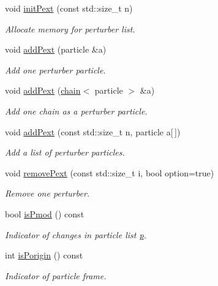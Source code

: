 \begin{DoxyCompactItemize}
void \hyperlink{classARC_1_1chain_a8e31c6a438a72d322889d0ca82fa6bf8}{init\+Pext} (const std\+::size\+\_\+t n)
\begin{DoxyCompactList}\small\item\em Allocate memory for perturber list. \end{DoxyCompactList}\item 
void \hyperlink{classARC_1_1chain_a029906394e7b73881c0980c00bf978f7}{add\+Pext} (particle \&a)
\begin{DoxyCompactList}\small\item\em Add one perturber particle. \end{DoxyCompactList}\item 
void \hyperlink{classARC_1_1chain_a5ab3934ce4a203cd57bfabcc3caf54b3}{add\+Pext} (\hyperlink{classARC_1_1chain}{chain}$<$ particle $>$ \&a)
\begin{DoxyCompactList}\small\item\em Add one chain as a perturber particle. \end{DoxyCompactList}\item 
void \hyperlink{classARC_1_1chain_a71c8d6ac1e58694b8207aabc7266110f}{add\+Pext} (const std\+::size\+\_\+t n, particle a\mbox{[}$\,$\mbox{]})
\begin{DoxyCompactList}\small\item\em Add a list of perturber particles. \end{DoxyCompactList}\item 
void \hyperlink{classARC_1_1chain_ae7d38ba85ba25ec0d7f6e4463a46afba}{remove\+Pext} (const std\+::size\+\_\+t i, bool option=true)
\begin{DoxyCompactList}\small\item\em Remove one perturber. \end{DoxyCompactList}\item 
bool \hyperlink{classARC_1_1chain_a9ed7067050141069bc98dccf8f7ab9d0}{is\+Pmod} () const
\begin{DoxyCompactList}\small\item\em Indicator of changes in particle list \hyperlink{classARC_1_1chain_af1793b656e139e1f87c2e0a55f87514b}{p}. \end{DoxyCompactList}\item 
int \hyperlink{classARC_1_1chain_afd0342ec9b20a318d811f3ec0f6c9950}{is\+Porigin} () const
\begin{DoxyCompactList}\small\item\em Indicator of particle frame. \end{DoxyCompactList}\item 

\end{DoxyCompactItemize}
